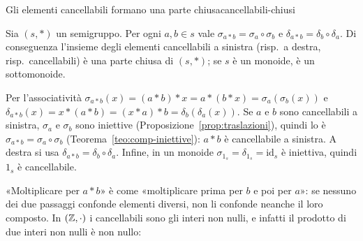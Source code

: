 \begin{concetto}
\begin{Proposizione}{Gli elementi cancellabili formano una parte chiusa}{cancellabili-chiusi}
    \begin{prerequisiti}
    \end{prerequisiti}
    Sia $(s, *)$ un semigruppo. Per ogni $a, b \in s$ vale $\sigma_{a * b} = \sigma_a \circ \sigma_b$ e $\delta_{a * b} = \delta_b \circ \delta_a$. Di conseguenza l'insieme degli
    elementi cancellabili a sinistra (risp.\ a destra, risp.\ cancellabili) è una parte chiusa di $(s, *)$; se $s$ è un monoide, è un sottomonoide.
\end{Proposizione}
\begin{dimostrazione}
    Per l'associatività $\sigma_{a * b}(x) = (a * b) * x = a * (b * x) = \sigma_a(\sigma_b(x))$ e $\delta_{a * b}(x) = x * (a * b) = (x * a) * b = \delta_b(\delta_a(x))$. Se $a$ e $b$
    sono cancellabili a sinistra, $\sigma_a$ e $\sigma_b$ sono iniettive (Proposizione~\ref{prop:traslazioni}), quindi lo è $\sigma_{a * b} = \sigma_a \circ \sigma_b$
    (Teorema~\ref{teo:comp-iniettive}): $a * b$ è cancellabile a sinistra. A destra si usa $\delta_{a * b} = \delta_b \circ \delta_a$. Infine, in un monoide $\sigma_{1_s} = \delta_{1_s} = \mathrm{id}_s$
    è iniettiva, quindi $1_s$ è cancellabile.
\end{dimostrazione}
\end{concetto}

\begin{spiegazione}
    «Moltiplicare per $a * b$» è come «moltiplicare prima per $b$ e poi per $a$»: se nessuno dei due passaggi confonde elementi diversi, non li
    confonde neanche il loro composto. In $(\mathbb{Z}, \cdot)$ i cancellabili sono gli interi non nulli, e infatti il prodotto di due interi non nulli è non nullo:
    \begin{center}
    \end{center}
\end{spiegazione}

